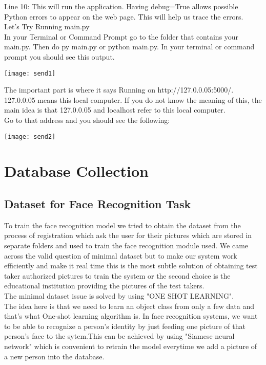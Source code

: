 \documentclass[12pt]{report}
\begin{document}
Line 10: This will run the application. Having debug=True allows possible Python errors to appear on the web page. This will help us trace the errors.\\

Let’s Try Running main.py\\

In your Terminal or Command Prompt go to the folder that contains your main.py. Then do py main.py or python main.py. In your terminal or command prompt you should see this output.\\
\begin{center}
\texttt{[image: send1]}
\end{center}

The important part is where it says Running on http://127.0.0.05:5000/.\\
127.0.0.05 means this local computer. If you do not know the meaning of this, the main idea is that 127.0.0.05 and localhost refer to this local computer.\\
Go to that address and you should see the following:
\begin{center}
\texttt{[image: send2]}
\end{center}

\section{Database Collection}
\subsection{Dataset for Face Recognition Task}
To train the face recognition model we tried to obtain the dataset from the process of registration which ask the user for their pictures which are stored in separate folders and used to train the face recognition module used. We came across the valid question of minimal dataset but to make our system work efficiently and make it real time this is the most subtle solution of obtaining test taker authorized pictures to train the system or the second choice is the educational institution providing the pictures of the test takers.\\
The minimal dataset issue is solved by using "ONE SHOT LEARNING".\\
The idea here is that we need to learn an object class from only a few data and that's what One-shot learning algorithm is.
In face recognition systems, we want to be able to recognize a person's identity by just feeding one picture of that person's face to the sytem.This can be achieved by using "Siamese neural network" which is convenient to retrain the model everytime we add a picture of a new person into the database.
\end{document}
